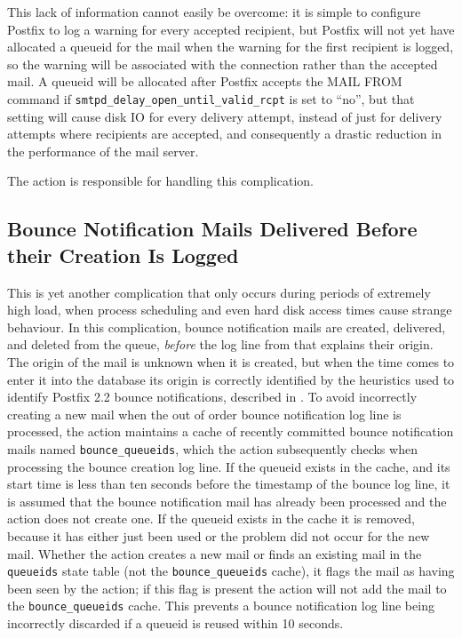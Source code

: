 This lack of information cannot easily be overcome: it is simple to
configure Postfix to log a warning for every accepted recipient, but
Postfix will not yet have allocated a queueid for the mail when the warning
for the first recipient is logged, so the warning will be associated with
the connection rather than the accepted mail.  A queueid will be allocated
after Postfix accepts the MAIL FROM command if
\texttt{smtpd\_delay\_open\_until\_valid\_rcpt} is set to ``no'', but that
setting will cause disk IO for every delivery attempt, instead of just for
delivery attempts where recipients are accepted, and consequently a drastic
reduction in the performance of the mail server.

The  action is responsible for handling this complication.

\subsection[Bounce Notification Mails Delivered Before their Creation is
Logged]{Bounce Notification Mails Delivered Before \newline{} their
Creation Is Logged}

\label{Bounce notification mails delivered before their creation is logged}

This is yet another complication that only occurs during periods of
extremely high load, when process scheduling and even hard disk access
times cause strange behaviour.  In this complication, bounce notification
mails are created, delivered, and deleted from the queue, \textit{before\/}
the log line from  that explains their origin.  The origin
of the mail is unknown when it is created, but when the time comes to enter
it into the database its origin is correctly identified by the heuristics
used to identify Postfix 2.2 bounce notifications, described in
.  To avoid incorrectly
creating a new mail when the out of order bounce notification log line is
processed, the  action maintains a cache of recently
committed bounce notification mails named \texttt{bounce\_queueids}, which
the  action subsequently checks when processing the
bounce creation log line.  If the queueid exists in the cache, and its
start time is less than ten seconds before the timestamp of the bounce log
line, it is assumed that the bounce notification mail has already been
processed and the  action does not create one.  If
the queueid exists in the cache it is removed, because it has either just
been used or the problem did not occur for the new mail.  Whether the
 action creates a new mail or finds an existing
mail in the \texttt{queueids} state table (not the
\texttt{bounce\_queueids} cache), it flags the mail as having been seen by
the  action; if this flag is present the
 action will not add the mail to the
\texttt{bounce\_queueids} cache.  This prevents a bounce notification log
line being incorrectly discarded if a queueid is reused within 10 seconds.

